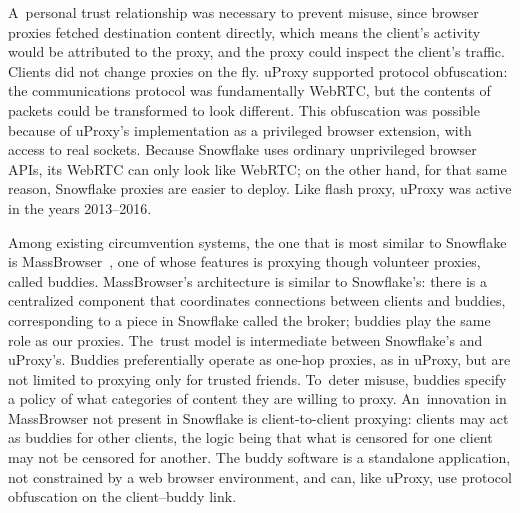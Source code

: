 \documentclass[letterpaper,twocolumn]{article}
\begin{document}
A~personal trust relationship was necessary to prevent misuse,
since browser proxies fetched destination content directly,
which means the client's activity would be attributed to the proxy,
and the proxy could inspect the client's traffic.
Clients did not change proxies on the fly.
uProxy supported protocol obfuscation:
the communications protocol was fundamentally WebRTC,
but the contents of packets could be transformed to look different.
This obfuscation was possible because of
uProxy's implementation as a privileged browser extension,
with access to real sockets.
Because Snowflake uses ordinary unprivileged browser APIs,
its WebRTC can only look like WebRTC;
on the other hand, for that same reason,
Snowflake proxies are easier to deploy.
Like flash proxy, uProxy was active in the years
2013--2016.

Among existing circumvention systems,
the one that is most similar to Snowflake is MassBrowser~\cite{Nasr2020a},
one of whose features is
proxying though volunteer proxies, called buddies.
MassBrowser's architecture is similar to Snowflake's:
there is a centralized component that coordinates
connections between clients and buddies,
corresponding to a piece in Snowflake called the broker;
buddies play the same role as our proxies.
The~trust model is intermediate between Snowflake's and uProxy's.
Buddies preferentially operate as one-hop proxies, as in uProxy,
but are not limited to proxying only for trusted friends.
To~deter misuse, buddies specify a policy of
what categories of content they are willing to proxy.
An~innovation in MassBrowser not present in Snowflake is client-to-client proxying:
clients may act as buddies for other clients,
the logic being that what is censored for one client may not be censored for another.
The buddy software is a standalone application,
not constrained by a web browser environment,
and can, like uProxy, use protocol obfuscation
on the client--buddy link.
\end{document}
